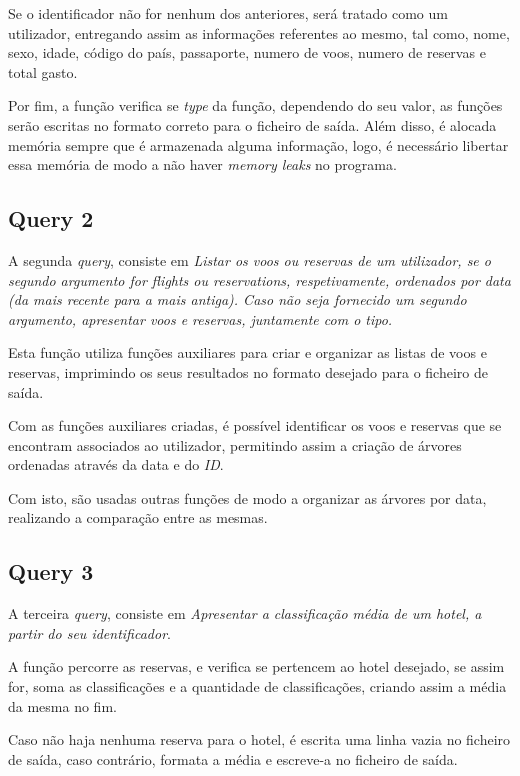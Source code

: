 \documentclass[a4paper,12pt]{scrreprt}
\begin{document}
Se o identificador não for nenhum dos anteriores, será tratado como um utilizador, entregando assim as informações referentes ao mesmo, tal como, nome, sexo, idade, código do país, passaporte, numero de voos, numero de reservas e total gasto.

Por fim, a função verifica se \textit{type} da função, dependendo do seu valor, as funções serão escritas no formato correto para o ficheiro de saída. Além disso, é alocada memória sempre que é armazenada alguma informação, logo, é necessário libertar essa memória de modo a não haver \textit{memory leaks} no programa.

\subsection{Query 2}

A segunda \textit{query}, consiste em \textit{Listar os voos ou reservas de um utilizador, se o segundo argumento for flights ou reservations,
respetivamente, ordenados por data (da mais recente para a mais antiga). Caso não seja fornecido
um segundo argumento, apresentar voos e reservas, juntamente com o tipo.}

Esta função utiliza funções auxiliares para criar e organizar as listas de voos e reservas, imprimindo os seus resultados no formato desejado para o ficheiro de saída.

Com as funções auxiliares criadas, é possível identificar os voos e reservas que se encontram associados ao utilizador, permitindo assim a criação de árvores ordenadas através da data e do \textit{ID}.

Com isto, são usadas outras funções de modo a organizar as árvores por data, realizando a comparação entre as mesmas.

\subsection{Query 3}

A terceira \textit{query}, consiste em \textit{Apresentar a classificação média de um hotel, a partir do seu identificador}.

A função percorre as reservas, e verifica se pertencem ao hotel desejado, se assim for, soma as classificações e a quantidade de classificações, criando assim a média da mesma no fim.

Caso não haja nenhuma reserva para o hotel, é escrita uma linha vazia no ficheiro de saída, caso contrário, formata a média e escreve-a no ficheiro de saída.
\end{document}
